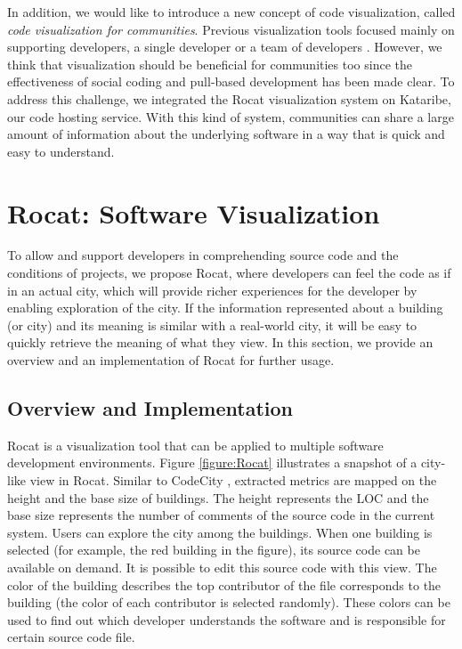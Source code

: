 \documentclass[conference]{IEEEtran}
\newcommand{\figref}[1]{Figure \ref{#1}}
\begin{document}
In addition, we would like to introduce a new concept of code visualization, called \textit{code visualization for communities}.
Previous visualization tools focused mainly on supporting developers, a single developer \cite{Wettel:2011:SSC:1985793.1985868} or a team of developers \cite{6648194}.
However, we think that visualization should be beneficial for communities too since the effectiveness of social coding \cite{Dabbish:2012:SCG:2145204.2145396} and pull-based development \cite{Gousios:2014:ESP:2568225.2568260} has been made clear.
To address this challenge, we integrated the \textsf{Rocat} visualization system on \textsf{Kataribe},  our code hosting service.
With this kind of system, communities can share a large amount of information about the underlying software in a way that is quick and easy to understand.


\section{Rocat: Software Visualization}
To allow and support developers in comprehending source code and the conditions of projects, we propose \textsf{Rocat}, where developers can feel the code as if in an actual city, which will provide richer experiences for the developer by enabling exploration of the city. 
If the information represented about a building (or city) and its meaning is similar with a real-world city, it will be easy to quickly retrieve the meaning of what they view. 
In this section, we provide an overview and an implementation of \textsf{Rocat} for further usage.

\subsection{Overview and Implementation}
\textsf{Rocat} is a visualization tool that can be applied to multiple software development environments. 
\figref{figure:Rocat} illustrates a snapshot of a city-like view in  \textsf{Rocat}.
Similar to \textsf{CodeCity} \cite{Wettel:2011:SSC:1985793.1985868}, extracted metrics are mapped on the height and the base size of buildings.
The height represents the LOC and the base size represents the number of comments of the source code in the current system.
Users can explore the city among the buildings. 
When one building is selected (for example, the red building in the figure), its source code can be available on demand. 
It is possible to edit this source code with this view.
The color of the building describes the top contributor of the file corresponds to the building (the color of each contributor is selected randomly).
These colors can be used to find out which developer understands the software and is responsible for certain source code file.
\end{document}
